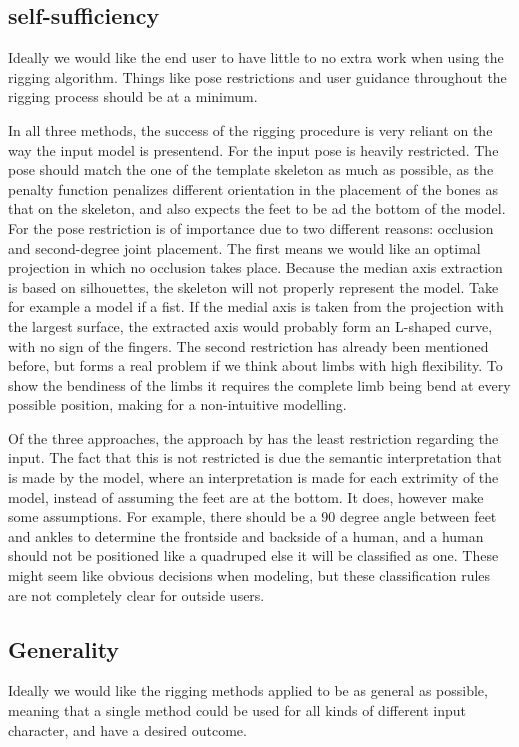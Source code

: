 \documentclass{article}
\begin{document}
\subsection{self-sufficiency}
Ideally we would like the end user to have little
to no extra work when using the rigging algorithm. Things like pose restrictions
and user guidance throughout the rigging process should be at a minimum.

In all three methods, the success of the rigging procedure is very reliant on
the way the input model is presentend. For \citep{paper1} the input pose is
heavily restricted. The pose should match the one of the template skeleton as
much as possible, as the penalty function penalizes different orientation in the
placement of the bones as that on the skeleton, and also expects the feet to be
ad the bottom of the model.
For \citep{paper2} the pose restriction is of importance due to two different
reasons: occlusion and second-degree joint placement. The first means we would
like an optimal projection in which no occlusion takes place. Because the median
axis extraction is based on silhouettes, the skeleton will not properly
represent the model. Take for example a model if a fist. If the medial axis is
taken from the projection with the largest surface, the extracted axis would
probably form an L-shaped curve, with no sign of the fingers.
The second restriction has already been mentioned before, but forms a real problem if we
think about limbs with high flexibility. To show the bendiness of the limbs it requires
the complete limb being bend at every possible position, making for a
non-intuitive modelling.

Of the three approaches, the approach by \citep{paper3} has the least
restriction regarding the input. The fact that this
is not restricted is due the semantic interpretation that is made by the model,
where an interpretation is made for each extrimity of the model, instead of
assuming the feet are at the bottom. It does, however make some assumptions.
For example, there should be a 90 degree angle between feet and ankles to
determine the frontside and backside of a human, and a human should not be
positioned like a quadruped else it will be classified as one.
These might seem like obvious decisions when modeling, but these
classification rules are not completely clear for outside users.

\subsection{Generality}
Ideally we would like the rigging methods applied to be as general as possible,
meaning that a single method could be used for all kinds of different input
character, and have a desired outcome.
\end{document}
